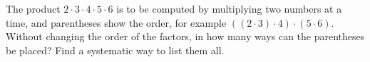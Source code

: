 The product $2\cdot3\cdot4\cdot5\cdot6$ is to be computed by multiplying two numbers at a time, and parentheses show the order, for example $((2\cdot3)\cdot4)\cdot(5\cdot6)$. Without changing the order of the factors, in how many ways can the parentheses be placed? Find a systematic way to list them all.
